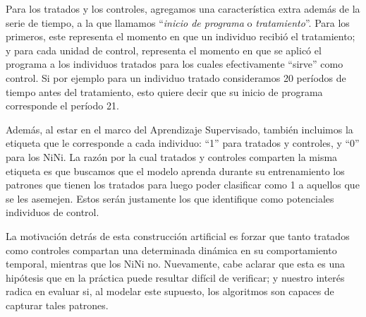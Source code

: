 \documentclass[../../main.tex]{subfiles}
\begin{document}
Para los tratados y los controles, agregamos una característica extra además de la serie
de tiempo, a la que llamamos ``\textit{inicio de programa} o \textit{tratamiento}''. Para
los primeros, este representa el momento en que un individuo recibió el tratamiento; y
para cada unidad de control, representa el momento en que se aplicó el programa a los
individuos tratados para los cuales efectivamente ``sirve'' como control. Si por ejemplo
para un individuo tratado consideramos 20 períodos de tiempo antes del tratamiento, esto
quiere decir que su inicio de programa corresponde el período 21.

Además, al estar en el marco del Aprendizaje Supervisado, también incluimos la etiqueta
que le corresponde a cada individuo: ``1'' para tratados y controles, y ``0'' para los
NiNi. La razón por la cual tratados y controles comparten la misma etiqueta es que
buscamos que el modelo aprenda durante su entrenamiento los patrones que tienen los
tratados para luego poder clasificar como 1 a aquellos que se les asemejen. Estos serán
justamente los que identifique como potenciales individuos de control.

La motivación detrás de esta construcción artificial es forzar que tanto tratados como
controles compartan una determinada dinámica en su comportamiento temporal, mientras que
los NiNi no. Nuevamente, cabe aclarar que esta es una hipótesis que en la práctica puede
resultar difícil de verificar; y nuestro interés radica en evaluar si, al modelar este
supuesto, los algoritmos son capaces de capturar tales patrones.
\end{document}
